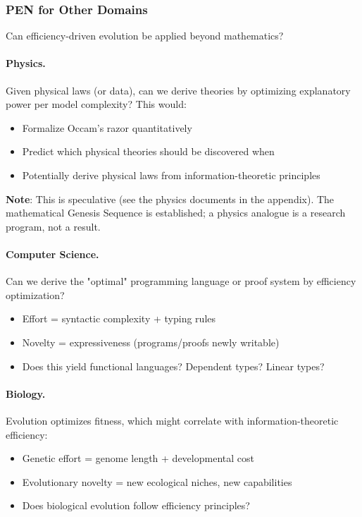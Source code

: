 \documentclass[11pt]{article}
\theoremstyle{definition}
\begin{document}
\subsubsection{PEN for Other Domains}

Can efficiency-driven evolution be applied beyond mathematics?

\paragraph{Physics.}
Given physical laws (or data), can we derive theories by optimizing explanatory power per model complexity? This would:
\begin{itemize}
\item Formalize Occam's razor quantitatively
\item Predict which physical theories should be discovered when
\item Potentially derive physical laws from information-theoretic principles
\end{itemize}

\textbf{Note}: This is speculative (see the physics documents in the appendix). The mathematical Genesis Sequence is established; a physics analogue is a research program, not a result.

\paragraph{Computer Science.}
Can we derive the "optimal" programming language or proof system by efficiency optimization?
\begin{itemize}
\item Effort = syntactic complexity + typing rules
\item Novelty = expressiveness (programs/proofs newly writable)
\item Does this yield functional languages? Dependent types? Linear types?
\end{itemize}

\paragraph{Biology.}
Evolution optimizes fitness, which might correlate with information-theoretic efficiency:
\begin{itemize}
\item Genetic effort = genome length + developmental cost
\item Evolutionary novelty = new ecological niches, new capabilities
\item Does biological evolution follow efficiency principles?
\end{itemize}
\end{document}
